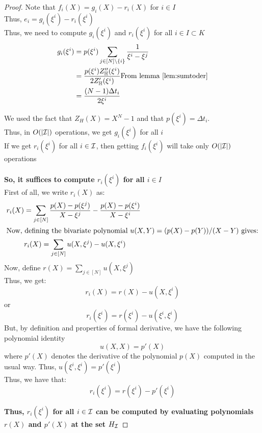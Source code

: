 \begin{proof}
    Note that $f_i(X) = g_i(X) - r_i(X)$ for $i\in I$\\
    Thus, $e_i=g_i(\xi^i)-r_i(\xi^i)$\\
    Thus, we need to compute $g_i(\xi^i)$ and $r_i(\xi^i)$ for all $i \in I \subset K$
    \begin{align*}
        g_i(\xi^i) &= p(\xi^i)\sum_{j\in [N]\setminus \{i\}} \frac{1}{\xi^i-\xi^j} \\
        &= \frac{p(\xi^i)Z_{\mathbb{H}}''(\xi^i)}{2 Z_{\mathbb{H}}'(\xi^i)} \text{From lemma \ref{lem:sumtoder}} \\
        &= \frac{(N-1)\Delta t_i}{2\xi^i}
    \end{align*}

    We used the fact that $Z_H(X)=X^N-1$ and that $p(\xi^i)=\Delta t_i$.\\
    Thus, in $O(|\mathcal{I}|)$ operations, we get $g_i(\xi^i)$ for all $i$\\
    If we get $r_i(\xi^i)$ for all $i \in \mathcal{I}$, then getting $f_i(\xi^i)$ will take only $O(|\mathcal{I}|)$ operations\\\\
    \textbf{So, it suffices to compute $r_i(\xi^i)$ for all $i \in I$}\\

    First of all, we write $r_i(X)$ as:
    \begin{align}\label{eq:rx}
    r_i(X) &= \sum_{j\in [N]}\frac{p(X)-p(\xi^j)}{X-\xi^j} - \frac{p(X)-p(\xi^i)}{X-\xi^i} \nonumber \\
    \intertext{Now, defining the bivariate polynomial $u(X,Y)=(p(X) - p(Y))/(X-Y)$ gives:}
    &r_i(X)= \sum_{j\in [N]}u(X,\xi^j) - u(X,\xi^i) \nonumber
    \end{align}
    Now, define $r(X)=\sum_{j\in [N]}u(X,\xi^j)$\\
    Thus, we get:\\
    $$r_i(X)=r(X)-u(X, \xi^i)$$
    or
    $$r_i(\xi^i)=r(\xi^i) - u(\xi^i,\xi^i)$$
    But, by definition and properties of formal derivative, we have the following polynomial identity
    $$u(X, X)= p'(X)$$
    where $p'(X)$ denotes the derivative of the polynomial $p(X)$ computed in the usual way. Thus, $u(\xi^i, \xi^i)=p'(\xi^i)$\\

    Thus, we have that:
    $$r_i(\xi^i)=r(\xi^i) - p'(\xi^i) $$

    \textbf{Thus, $r_i(\xi^i)$ for all $i \in \mathcal{I}$ can be computed by evaluating polynomials $r(X)$ and $p'(X)$ at the set $H_{\mathcal{I}}$}



\end{proof}
